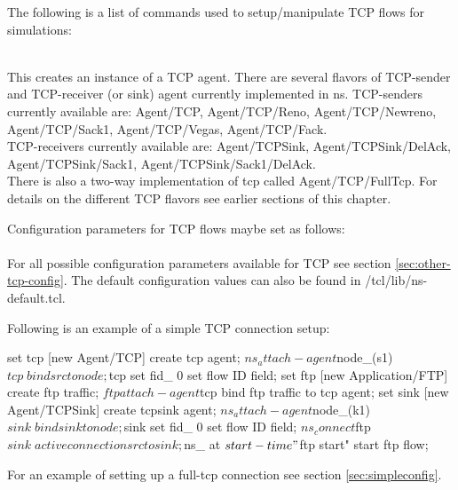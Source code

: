 The following is a list of commands used to setup/manipulate TCP flows
for simulations:
\begin{flushleft}
\\
This creates an instance of a TCP agent. There are several flavors of
TCP-sender and TCP-receiver (or sink) agent currently implemented in ns.
TCP-senders currently available are:
Agent/TCP, Agent/TCP/Reno, Agent/TCP/Newreno, Agent/TCP/Sack1, Agent/TCP/Vegas,
Agent/TCP/Fack. \\
TCP-receivers currently available are:
Agent/TCPSink, Agent/TCPSink/DelAck, Agent/TCPSink/Sack1,
Agent/TCPSink/Sack1/DelAck.\\
There is also a two-way implementation of tcp called Agent/TCP/FullTcp. For
details on the different TCP flavors see earlier sections of this chapter.


Configuration parameters for TCP flows maybe set as follows:\\
\\
For all possible configuration parameters available for TCP see section
\ref{sec:other-tcp-config}. The default configuration values can also be
found in \ns/tcl/lib/ns-default.tcl.


Following is an example of a simple TCP connection setup:
\begin{program}
set tcp [new Agent/TCP] \; create tcp agent;
$ns_ attach-agent $node_(s1) $tcp \; bind src to node;
$tcp set fid_ 0   \; set flow ID field;
set ftp [new Application/FTP]   \; create ftp traffic;
$ftp attach-agent $tcp  \; bind ftp traffic to tcp agent;
set sink [new Agent/TCPSink] \; create tcpsink agent;
$ns_ attach-agent $node_(k1) $sink \; bind sink to node;
$sink set fid_ 0  \; set flow ID field;
$ns_ connect $ftp $sink \; active connection src to sink;
$ns_ at $start-time "$ftp start"  \; start ftp flow;
\end{program}

For an example of setting up a full-tcp connection see section
\ref{sec:simpleconfig}.

\end{flushleft}

\endinput
